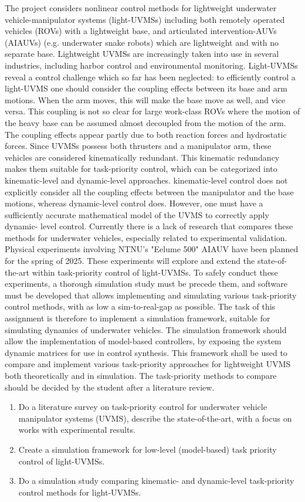 The project considers nonlinear control methods for lightweight underwater vehicle-manipulator
systems (light-UVMSs) including both remotely operated vehicles (ROVs) with a lightweight
base, and articulated intervention-AUVs (AIAUVs) (e.g. underwater snake robots) which are
lightweight and with no separate base. Lightweight UVMSs are increasingly taken into use in
several industries, including harbor control and environmental monitoring.
Light-UVMSs reveal a control challenge which so far has been neglected: to efficiently
control a light-UVMS one should consider the coupling effects between its base and arm
motions. When the arm moves, this will make the base move as well, and vice versa. This
coupling is not so clear for large work-class ROVs where the motion of the heavy base can be
assumed almost decoupled from the motion of the arm. The coupling effects appear partly due
to both reaction forces and hydrostatic forces.
Since UVMSs possess both thrusters and a manipulator arm, these vehicles are considered
kinematically redundant. This kinematic redundancy makes them suitable for task-priority control, 
which can be categorized into kinematic-level and dynamic-level approaches. kinematic-level 
control does not explicitly consider all the coupling effects between the
manipulator and the base motions, whereas dynamic-level control does. However, one must
have a sufficiently accurate mathematical model of the UVMS to correctly apply dynamic-
level control. Currently there is a lack of research that compares these methods for underwater
vehicles, especially related to experimental validation.
Physical experiments involving NTNU's "Eelume 500" AIAUV have been planned for the spring of 2025. These experiments will explore and extend the state-of-the-art within task-priority control of light-UVMSs. To safely conduct these experiments, a thorough simulation study must be precede them, and software must be developed that allows implementing and simulating various task-priority control methods, with as low a sim-to-real-gap as possible. The task of this assignment is therefore to implement a simulation framework, suitable for simulating dynamics of underwater vehicles. The simulation framework should allow the implementation of model-based controllers, by exposing the system dynamic matrices for use in control synthesis. This framework shall be used to compare and implement various task-priority approaches for lightweight UVMS both theoretically and in simulation. The task-priority methods to compare should be decided by the student after a literature review.
\begin{enumerate}
\item Do a literature survey on task-priority control for underwater vehicle manipulator
systems (UVMS), describe the state-of-the-art, with a focus on works with experimental
results.
\item Create a simulation framework for low-level (model-based) task priority control of light-UVMSs.
\item Do a simulation study comparing kinematic- and dynamic-level task-priority control
methods for light-UVMSs.
\end{enumerate}
\newpage
